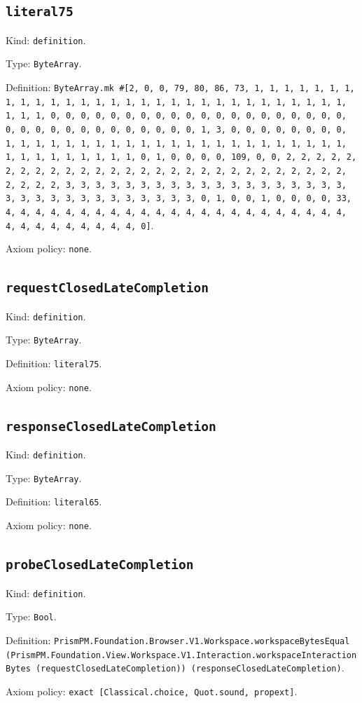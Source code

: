 \documentclass[11pt]{article}
\begin{document}
\subsection*{\texttt{literal75}}
\noindent Kind: \texttt{definition}.\par
\noindent Type: \texttt{ByteArray}.\par
\noindent Definition: \texttt{ByteArray.mk \#[2, 0, 0, 79, 80, 86, 73, 1, 1, 1, 1, 1, 1, 1, 1, 1, 1, 1, 1, 1, 1, 1, 1, 1, 1, 1, 1, 1, 1, 1, 1, 1, 1, 1, 1, 1, 1, 1, 1, 1, 0, 0, 0, 0, 0, 0, 0, 0, 0, 0, 0, 0, 0, 0, 0, 0, 0, 0, 0, 0, 0, 0, 0, 0, 0, 0, 0, 0, 0, 0, 0, 0, 0, 1, 3, 0, 0, 0, 0, 0, 0, 0, 0, 1, 1, 1, 1, 1, 1, 1, 1, 1, 1, 1, 1, 1, 1, 1, 1, 1, 1, 1, 1, 1, 1, 1, 1, 1, 1, 1, 1, 1, 1, 1, 1, 0, 1, 0, 0, 0, 0, 109, 0, 0, 2, 2, 2, 2, 2, 2, 2, 2, 2, 2, 2, 2, 2, 2, 2, 2, 2, 2, 2, 2, 2, 2, 2, 2, 2, 2, 2, 2, 2, 2, 2, 2, 3, 3, 3, 3, 3, 3, 3, 3, 3, 3, 3, 3, 3, 3, 3, 3, 3, 3, 3, 3, 3, 3, 3, 3, 3, 3, 3, 3, 3, 3, 3, 3, 0, 1, 0, 0, 1, 0, 0, 0, 0, 33, 4, 4, 4, 4, 4, 4, 4, 4, 4, 4, 4, 4, 4, 4, 4, 4, 4, 4, 4, 4, 4, 4, 4, 4, 4, 4, 4, 4, 4, 4, 4, 4, 0]}.\par
\noindent Axiom policy: \texttt{none}.\par
\subsection*{\texttt{requestClosedLateCompletion}}
\noindent Kind: \texttt{definition}.\par
\noindent Type: \texttt{ByteArray}.\par
\noindent Definition: \texttt{literal75}.\par
\noindent Axiom policy: \texttt{none}.\par
\subsection*{\texttt{responseClosedLateCompletion}}
\noindent Kind: \texttt{definition}.\par
\noindent Type: \texttt{ByteArray}.\par
\noindent Definition: \texttt{literal65}.\par
\noindent Axiom policy: \texttt{none}.\par
\subsection*{\texttt{probeClosedLateCompletion}}
\noindent Kind: \texttt{definition}.\par
\noindent Type: \texttt{Bool}.\par
\noindent Definition: \texttt{PrismPM.Foundation.Browser.V1.Workspace.workspaceBytesEqual (PrismPM.Foundation.View.Workspace.V1.Interaction.workspaceInteractionBytes (requestClosedLateCompletion)) (responseClosedLateCompletion)}.\par
\noindent Axiom policy: \texttt{exact [Classical.choice, Quot.sound, propext]}.\par
\end{document}
